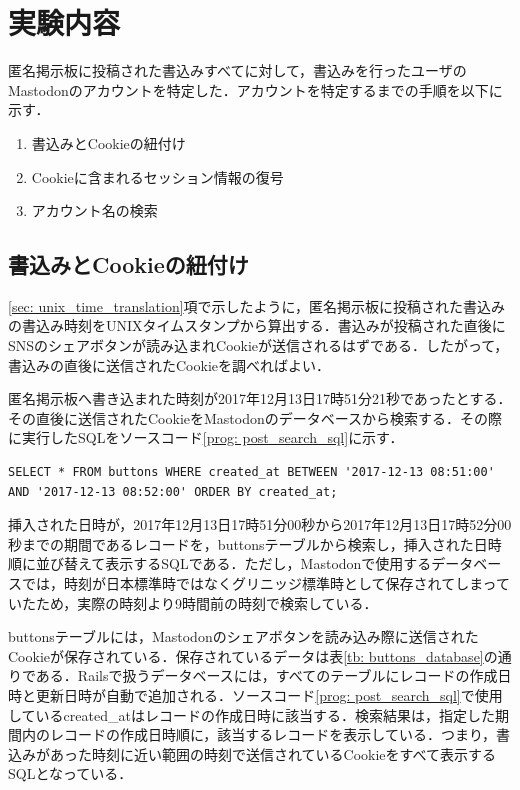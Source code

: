 \documentclass[10pt, a4paper]{jreport}
\begin{document}
\section{実験内容}\label{sec: exp_flow}
匿名掲示板に投稿された書込みすべてに対して，書込みを行ったユーザのMastodonのアカウントを特定した．アカウントを特定するまでの手順を以下に示す．

\begin{enumerate}
\item{書込みとCookieの紐付け}
\item{Cookieに含まれるセッション情報の復号}
\item{アカウント名の検索}
\end{enumerate}

\subsection{書込みとCookieの紐付け}
\ref{sec: unix_time_translation}項で示したように，匿名掲示板に投稿された書込みの書込み時刻をUNIXタイムスタンプから算出する．書込みが投稿された直後にSNSのシェアボタンが読み込まれCookieが送信されるはずである．したがって，書込みの直後に送信されたCookieを調べればよい．

匿名掲示板へ書き込まれた時刻が2017年12月13日17時51分21秒であったとする．その直後に送信されたCookieをMastodonのデータベースから検索する．その際に実行したSQLをソースコード\ref{prog: post_search_sql}に示す．

\begin{lstlisting}[caption=2017年12月13日17時50分34秒にあった書込みに対応するCookieを検索するSQL,label=prog: post_search_sql]
SELECT * FROM buttons WHERE created_at BETWEEN '2017-12-13 08:51:00' AND '2017-12-13 08:52:00' ORDER BY created_at;
\end{lstlisting}

挿入された日時が，2017年12月13日17時51分00秒から2017年12月13日17時52分00秒までの期間であるレコードを，buttonsテーブルから検索し，挿入された日時順に並び替えて表示するSQLである．ただし，Mastodonで使用するデータベースでは，時刻が日本標準時ではなくグリニッジ標準時として保存されてしまっていたため，実際の時刻より9時間前の時刻で検索している．

buttonsテーブルには，Mastodonのシェアボタンを読み込み際に送信されたCookieが保存されている．保存されているデータは表\ref{tb: buttons_database}の通りである．Railsで扱うデータベースには，すべてのテーブルにレコードの作成日時と更新日時が自動で追加される．ソースコード\ref{prog: post_search_sql}で使用しているcreated\_atはレコードの作成日時に該当する．検索結果は，指定した期間内のレコードの作成日時順に，該当するレコードを表示している．つまり，書込みがあった時刻に近い範囲の時刻で送信されているCookieをすべて表示するSQLとなっている．
\end{document}
